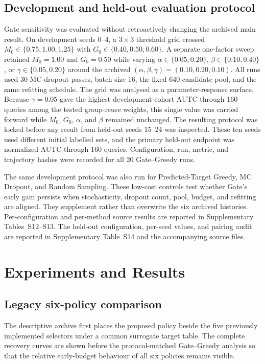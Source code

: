 \subsection{Development and held-out evaluation protocol}

Gate sensitivity was evaluated without retroactively changing the archived main
result.
On development seeds 0--4, a $3\times3$ threshold grid crossed
$M_0\in\{0.75,1.00,1.25\}$ with
$G_0\in\{0.40,0.50,0.60\}$. A separate one-factor sweep retained
$M_0=1.00$ and $G_0=0.50$ while varying
$\alpha\in\{0.05,0.20\}$, $\beta\in\{0.10,0.40\}$, or
$\gamma\in\{0.05,0.20\}$ around the archived
$(\alpha,\beta,\gamma)=(0.10,0.20,0.10)$. All runs used 30 MC-dropout passes,
batch size 16, the fixed 640-candidate pool, and the same refitting schedule.
The grid was analysed as a parameter-response surface. Because $\gamma=0.05$ gave the
highest development-cohort AUTC through 160 queries among the tested group-reuse
weights, this single value was carried forward while $M_0$, $G_0$, $\alpha$, and
$\beta$ remained unchanged. The resulting protocol was locked before any result
from held-out seeds 15--24 was inspected. These ten seeds used different initial
labelled sets, and the primary held-out endpoint was normalized AUTC through 160
queries. Configuration, run, metric, and trajectory hashes were recorded for all
20 Gate--Greedy runs.

The same development protocol was also run for Predicted-Target Greedy, MC
Dropout, and Random Sampling. These low-cost controls test whether Gate's early
gain persists when stochasticity, dropout count, pool, budget, and refitting are
aligned. They supplement rather than overwrite the
six archived histories. Per-configuration and per-method source results are
reported in Supplementary Tables~S12--S13. The held-out configuration,
per-seed values, and pairing audit are reported in Supplementary Table~S14 and
the accompanying source files.

\section{Experiments and Results}

\subsection{Legacy six-policy comparison}

The descriptive archive first places the proposed policy beside the five
previously implemented selectors under a common surrogate target table. The
complete recovery curves are shown before the protocol-matched Gate--Greedy
analysis so that the relative early-budget behaviour of all six policies remains
visible.

